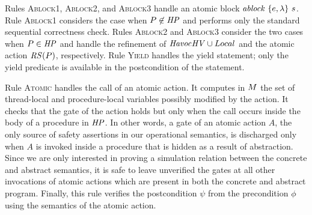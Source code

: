 Rules \textsc{Ablock1}, \textsc{Ablock2}, and \textsc{Ablock3} handle an atomic block $\mathit{ablock}\ {\{e,\lambda\}}\ {s}$.
Rule \textsc{Ablock1} considers the case when $P \not \in \mathit{HP}$ and performs only the 
standard sequential correctness check.
Rules \textsc{Ablock2} and \textsc{Ablock3} consider the two cases when $P \in \mathit{HP}$ and handle
the refinement of $\mathit{Havoc}{\mathit{HV} \cup Local}$ and the atomic action $\mathit{RS}(P)$, respectively.
Rule \textsc{Yield} handles the yield statement; only the yield predicate is available in the postcondition of the statement.


Rule \textsc{Atomic} handles the call of an atomic action.
It computes in $M$ the set of thread-local and procedure-local variables possibly modified by the action.
It checks that the gate of the action holds but only when the call occurs inside the body of a procedure in $\mathit{HP}$.
In other words, a gate of an atomic action $A$, the only source of safety assertions in our operational semantics, is discharged 
only when $A$ is invoked inside a procedure that is hidden as a result of abstraction.
Since we are only interested in proving a simulation relation between the concrete and abstract semantics, 
it is safe to leave unverified the gates at all other invocations of atomic actions which are present in both the concrete and abstract program.
Finally, this rule verifies the postcondition $\psi$ from the precondition $\phi$ using the semantics of the atomic action.

